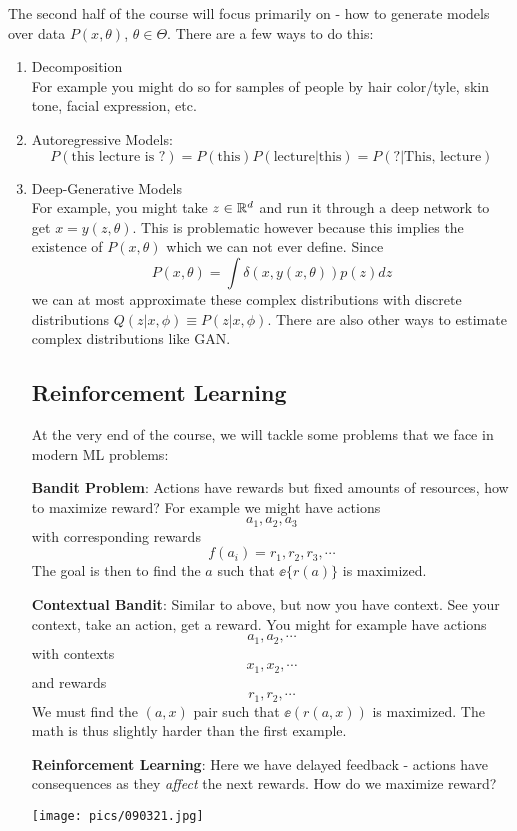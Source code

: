 \documentclass[11pt]{scrartcl}
\begin{document}
The second half of the course will focus primarily on  - how to generate models over data $P(x,\theta)$, $\theta \in \Theta$. There are a few ways to do this:
\begin{enumerate}[label=(\alph*)]
    \item Decomposition  \\
    For example you might do so for samples of people by hair color/tyle, skin tone, facial expression, etc. 
    \item Autoregressive Models: $$P(\text{this lecture is ?})=P(\text{this})P(\text{lecture}|\text{this})=P(?|\text{This, lecture})$$
    \item Deep-Generative Models \\
    For example, you might take $z \in \mathbb{R}^d$ and run it through a deep network to get $x=y(z,\theta)$. This is problematic however because this implies the existence of $P(x,\theta)$ which we can not ever define. Since $$P(x,\theta)=\int \delta(x,y(x,\theta))p(z)dz$$ we can at most approximate these complex distributions with discrete distributions $Q(z|x, \phi) \equiv P(z| x, \phi)$. There are also other ways to estimate complex distributions like GAN.
    
    \subsection{Reinforcement Learning}
    At the very end of the course, we will tackle some problems that we face in modern ML problems:
    
    \textbf{Bandit Problem}: Actions have rewards but fixed amounts of resources, how to maximize reward? For example we might have actions 
    $$a_1, a_2, a_3$$ with corresponding rewards $$f(a_i)=r_1, r_2, r_3, \cdots$$ The goal is then to find the $a$ such that $\ee\{r(a)\}$ is maximized. 
    
    \textbf{Contextual Bandit}: Similar to above, but now you have context. See your context, take an action, get a reward. You might for example have actions $$a_1,a_2, \cdots$$ with contexts $$x_1,x_2,\cdots$$ and rewards $$r_1,r_2,\cdots$$ We must find the $(a,x)$ pair such that $\ee(r(a,x))$ is maximized. The math is thus slightly harder than the first example.
    
    \textbf{Reinforcement Learning}: Here we have delayed feedback - actions have consequences as they \textit{affect} the next rewards. How do we maximize reward? 
    \begin{center}
        \texttt{[image: pics/090321.jpg]}
    \end{center}
\end{enumerate}
\end{document}

